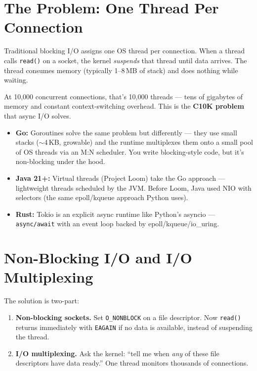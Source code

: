 \documentclass[11pt,a4paper,oneside]{book}
\begin{document}
\section{The Problem: One Thread Per Connection}

Traditional blocking I/O assigns one OS thread per connection. When a thread calls
\texttt{read()} on a socket, the kernel \emph{suspends} that thread until data arrives.
The thread consumes memory (typically 1--8\,MB of stack) and does nothing while waiting.

At 10,000 concurrent connections, that's 10,000 threads --- tens of gigabytes of memory and
constant context-switching overhead. This is the \textbf{C10K problem} that async I/O solves.

\begin{analogybox}
\begin{itemize}
    \item \textcolor{goblue}{\textbf{Go:}} Goroutines solve the same problem but differently ---
          they use small stacks ($\sim$4\,KB, growable) and the runtime multiplexes them onto a small
          pool of OS threads via an M:N scheduler. You write blocking-style code, but it's
          non-blocking under the hood.
    \item \textcolor{javaorange}{\textbf{Java 21+:}} Virtual threads (Project Loom) take the Go
          approach --- lightweight threads scheduled by the JVM. Before Loom, Java used NIO with
          selectors (the same epoll/kqueue approach Python uses).
    \item \textcolor{BrickRed}{\textbf{Rust:}} Tokio is an explicit async runtime like Python's
          asyncio --- \texttt{async/await} with an event loop backed by epoll/kqueue/io\_uring.
\end{itemize}
\end{analogybox}

\section{Non-Blocking I/O and I/O Multiplexing}

The solution is two-part:

\begin{enumerate}
    \item \textbf{Non-blocking sockets.} Set \texttt{O\_NONBLOCK} on a file descriptor. Now
          \texttt{read()} returns immediately with \texttt{EAGAIN} if no data is available,
          instead of suspending the thread.
    \item \textbf{I/O multiplexing.} Ask the kernel: ``tell me when \emph{any} of these
          file descriptors have data ready.'' One thread monitors thousands of connections.
\end{enumerate}
\end{document}
